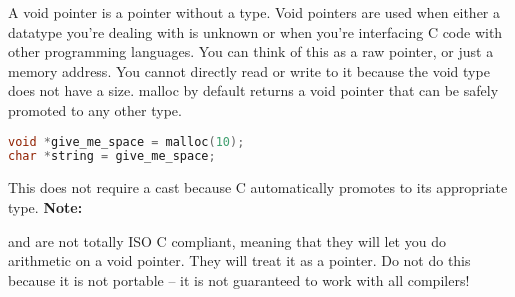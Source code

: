 A void pointer is a pointer without a type.
Void pointers are used when either a datatype you're dealing with is unknown or when you're interfacing C code with other programming languages.
You can think of this as a raw pointer, or just a memory address.
You cannot directly read or write to it because the void type does not have a size.
malloc by default returns a void pointer that can be safely promoted to any other type.

\begin{lstlisting}[language=C]
void *give_me_space = malloc(10);
char *string = give_me_space;
\end{lstlisting}

This does not require a cast because C automatically promotes  to its appropriate type. \textbf{Note:}

 and  are not totally ISO C compliant, meaning that they will let you do arithmetic on a void pointer.
They will treat it as a  pointer.
Do not do this because it is not portable -- it is not guaranteed to work with all compilers!


